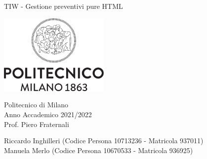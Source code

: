 \begin{titlepage}
	\begin{center}
		\vspace*{1cm}
		
		\Huge
		TIW - Gestione preventivi pure HTML\\
		\vspace{4cm}
		
		\includegraphics[width=0.4\textwidth]{polimilogo}
		
		\vspace{3.5cm}
		\LARGE
		Politecnico di Milano\\
		Anno Accademico 2021/2022\\
		\vspace{0.5cm}
		\Large
		Prof. Piero Fraternali\\
		
		\vspace{5cm}
		
		{Riccardo Inghilleri (Codice Persona 10713236 - Matricola 937011)\\Manuela Merlo (Codice Persona 10670533 - Matricola 936925)}
		
		\vfill
		
		\vspace{0.8cm}
		
	\end{center}
\end{titlepage}